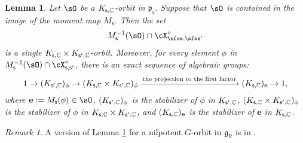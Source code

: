 \documentclass[12pt,a4paper]{amsart}
\newcommand{\g}{\mathfrak g}
\newcommand{\p}{\mathfrak p}
\newcommand{\R}{\mathbb R}
\newcommand{\be}{\begin {equation}}
\newcommand{\ee}{\end {equation}}
\numberwithin{equation}{section}
\newtheorem{lem}[thm]{Lemma}
\theoremstyle{remark}
\newtheorem*{remark}{Remark}
\def\cf{\emph{cf.} }
\begin{document}
\def\Ms{M_{\sfss}}
\def\cXsso{\cX_{\sfss,\sfss'}^\circ}
\def\cXss{\cX_{\sfss,\sfss'}}
\def\Ksp{K_{\sfss',\bC}}
\def\Lsp{L_{\sfss'}}
\def\Ls{L_{\sfss}}
\def\Vsp{V_{\sfss'}}
\begin{lem}
  \label{descko}
Let $\sO$ be a $K_{\mathsf s, \mathbb{C}}$-orbit in $\p_{\mathsf s}$. Suppose that $\sO$ is contained in the image of the moment map $M_\mathsf s$. Then the set
\be\label{kkpo}
  M_{\mathsf s}^{-1}(\sO)\cap \cXsso
\ee
is a single $K_{\mathsf s,\mathbb{C}}\times K_{\mathsf s', \mathbb{C}}$-orbit. Moreover, for every element $\phi$ in $M_{\mathsf s}^{-1}(\sO)\cap \cX_{\mathsf s, \mathsf s'}^\circ$, there is an exact sequence of algebraic groups:
\[
  1\rightarrow (K_{\mathsf s',\mathbb{C}})_\phi \rightarrow (K_{\mathsf s,\mathbb{C}}\times K_{\mathsf s', \mathbb{C}})_\phi\xrightarrow{\textrm{the projection to the first factor}} (K_{\mathsf s,\mathbb{C}})_{\mathbf e}\rightarrow 1,
\]
where $\mathbf e:=M_\mathsf s(\phi)\in \sO$,  $(K_{\mathsf s',\mathbb{C}})_\phi$ is the stabilizer of $\phi$ in $K_{\mathsf s',\mathbb{C}}$, $(K_{\mathsf s,\mathbb{C}}\times K_{\mathsf s', \mathbb{C}})_\phi$ is the stabilizer of $\phi$ in $K_{\mathsf s,\mathbb{C}}\times K_{\mathsf s', \mathbb{C}}$, and $(K_{\mathsf s,\mathbb{C}})_{\mathbf e}$ is the stabilizer of $\mathbf e$ in $K_{\mathsf s,\mathbb{C}}$.
\end{lem}

\begin{remark} A version of Lemma \ref{descko} for a nilpotent $G$-orbit in $\g_{\R}$ is in \cite[Lemma 3.4]{Zh}.
\end{remark}
\end{document}
